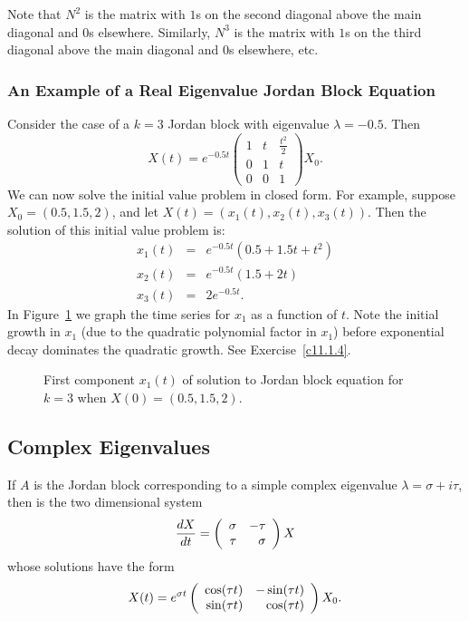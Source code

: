 \documentclass{ximera}
\begin{document}
Note that $N^2$ is the matrix with $1$s on the second diagonal above the main
diagonal and $0$s elsewhere.  Similarly, $N^3$ is the matrix with $1$s on the 
third diagonal above the main diagonal and $0$s elsewhere, etc.
 

\subsubsection*{An Example of a Real Eigenvalue Jordan Block Equation}

Consider the case of a $k=3$ Jordan block with eigenvalue $\lambda=-0.5$.  
Then
\[
X(t) = e^{-0.5t} \left(\begin{array}{ccc} 1 & t & \frac{t^2}{2} \\
0 & 1 & t \\ 0 & 0 & 1 \end{array}\right)X_0.
\]
We can now solve the initial value problem
 in closed form.  For example,
suppose $X_0=(0.5,1.5,2)$, and let $X(t)=(x_1(t),x_2(t),x_3(t))$.  Then 
the solution of this initial value problem is:
\begin{equation}  \label{E:x1examp}
\begin{array}{rcl}
x_1(t) & = & e^{-0.5t}(0.5 + 1.5t + t^2) \\
x_2(t) & = & e^{-0.5t}(1.5 + 2t) \\
x_3(t) & = & 2e^{-0.5t}.
\end{array}
\end{equation}
In Figure~\ref{F:Jordan} we graph the time series for $x_1$ as a
function of $t$.  Note the initial growth in $x_1$ (due to the quadratic 
polynomial factor in $x_1$) before exponential decay 
dominates the quadratic growth.  See Exercise~\ref{c11.1.4}.

\begin{figure}[htb]
     \centerline{%
     }
     \caption{First component $x_1(t)$ of solution to
	Jordan block equation for $k=3$ when $X(0)=(0.5,1.5,2)$.}
     \label{F:Jordan}
\end{figure}

\subsection*{Complex Eigenvalues}

If $A$ is the Jordan block corresponding to a simple complex eigenvalue
$\lambda=\sigma+i\tau$, then  is the two dimensional system 
\[
\frac{dX}{dt}=\left(\begin{array}{rr} \sigma & -\tau\\ \tau &\sigma\end{array}\right) X
\]
whose solutions have the form 
\[
X(t)=e^{\sigma t}\left(\begin{array}{rr} \cos(\tau t) & -\sin(\tau t)\\ \sin(\tau t) &\cos(\tau t)\end{array}\right) X_0.
\]
\end{document}
